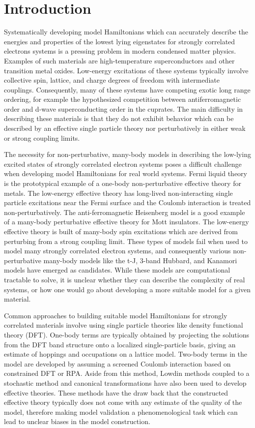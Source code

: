 \documentclass{article}
\begin{document}
\section{Introduction}
Systematically developing model Hamiltonians which can accurately describe the energies and properties of the lowest lying eigenstates for strongly correlated electrons systems is a pressing problem in modern condensed matter physics. 
Examples of such materials are high-temperature superconductors and other transition metal oxides.
Low-energy excitations of these systems typically involve collective spin, lattice, and charge degrees of freedom with intermediate couplings.
Consequently, many of these systems have competing exotic long range ordering, for example the hypothesized competition between antiferromagnetic order and d-wave superconducting order in the cuprates.
The main difficulty in describing these materials is that they do not exhibit behavior which can be described by an effective single particle theory nor perturbatively in either weak or strong coupling limits.

The necessity for non-perturbative, many-body models in describing the low-lying excited states of strongly correlated electron systems poses a difficult challenge when developing model Hamiltonians for real world systems.
Fermi liquid theory is the prototypical example of a one-body non-perturbative effective theory for metals.
The low-energy effective theory has long-lived non-interacting single particle excitations near the Fermi surface and the Coulomb interaction is treated non-perturbatively.
The anti-ferromagnetic Heisenberg model is a good example of a many-body perturbative effective theory for Mott insulators.
The low-energy effective theory is built of many-body spin excitations which are derived from perturbing from a strong coupling limit.
These types of models fail when used to model many strongly correlated electron systems, and consequently various non-perturbative many-body models like the t-J, 3-band Hubbard, and Kanamori models have emerged as candidates.
While these models are computational tractable to solve, it is unclear whether they can describe the complexity of real systems, or how one would go about developing a more suitable model for a given material.

Common approaches to building suitable model Hamiltonians for strongly correlated materials involve using single particle theories like density functional theory (DFT).
One-body terms are typically obtained by projecting the solutions from the DFT band structure onto a localized single-particle basis, giving an estimate of hoppings and occupations on a lattice model.
Two-body terms in the model are developed by assuming a screened Coulomb interaction based on constrained DFT or RPA.
Aside from this method, Lowdin methods coupled to a stochastic method and canonical transformations have also been used to develop effective theories.
These methods have the draw back that the constructed effective theory typically does not come with any estimate of the quality of the model, therefore making model validation a phenomenological task which can lead to unclear biases in the model construction.
\end{document}

